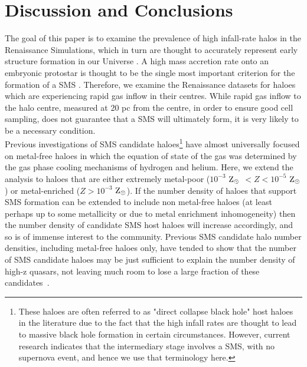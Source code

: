 \documentclass[twocolumn,iop,revtex4]{openjournal}
\newcommand{\zsolar} {$\rm{Z_{\odot}}~$}
\newcommand{\zsolarc} {$\rm{Z_{\odot}}$}
\begin{document}
\section{Discussion and Conclusions} \label{Sec:Discussion}

The goal of this paper is to examine the prevalence of high infall-rate halos in the
Renaissance Simulations, which in turn are thought to accurately represent early structure formation in our Universe \citep{Chen_2014, Xu_2013, Xu_2014, OShea_2015,
  Barrow_2017, Wise_2019}. A high mass accretion rate onto an embryonic protostar is thought to be the
single most important criterion for the formation of a SMS \citep{Hosokawa_2013, Sakurai_2016,
  Woods_2018}. Therefore, we examine the Renaissance datasets for haloes which are experiencing
rapid gas inflow in their centres. While rapid gas inflow to the halo centre, 
measured at 20 pc from the centre, in order to ensure good cell sampling,
does not guarantee
that a SMS will ultimately form, it is very likely to be a necessary condition. \\
\indent Previous investigations of SMS candidate haloes\footnote{These haloes are often
  referred to as "direct collapse black hole" host haloes in the literature due to the fact
  that the high infall rates are thought to lead to massive black hole formation in certain
  circumstances. However, current research indicates that the intermediary stage involves a
  SMS, with no supernova event, and hence we use that terminology here.} have almost
universally focused on
metal-free haloes in which the equation of state of the gas was determined by the gas phase
cooling mechanisms of hydrogen and helium. Here, we extend the analysis to haloes that are either
extremely metal-poor ($10^{-3}$ \zsolar $< Z < 10^{-5}$ \zsolarc) or metal-enriched ($Z > 10^{-3}$ \zsolarc). If the number density of haloes that support SMS formation
can be extended to include non metal-free haloes (at least perhaps up to some
metallicity or due to metal enrichment inhomogeneity) then the
number density of candidate SMS host haloes will increase accordingly, and so is of
immense interest to the community. 
Previous SMS candidate halo number densities, including metal-free haloes only,
have tended to show that the number of SMS candidate haloes may be just sufficient to explain the number density of high-z quasars,
not leaving much room to lose a large fraction of these candidates~\citep{Agarwal_2012, Visbal_2014b, Agarwal_2015b, Latif_2014a,
  Valiante_2016, Habouzit_2016, Valiante_2017, Habouzit_2017, Regan_2017}. \\
\end{document}
